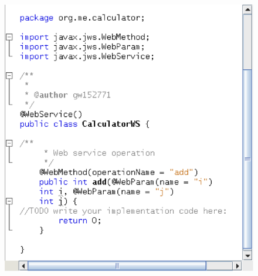\begin{enumerate}
\begin{figure}
\begin{center}
\includegraphics[scale=1]{J6}
\label{J6}
\end{center}
\end{figure}


\end{enumerate}
